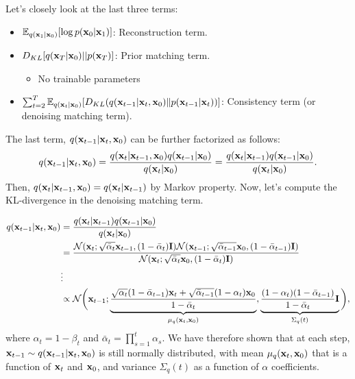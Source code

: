 Let's closely look at the last three terms:
\begin{itemize}
	\item $\mathbb{E}_{q({\mathbf{x}}_{1}|{\mathbf{x}}_0)}[\log p({\mathbf{x}}_0|{\mathbf{x}}_{1})]$: Reconstruction term. 
	\item $D_{KL} [ q({\mathbf{x}}_{T}|{\mathbf{x}}_0)||p({\mathbf{x}}_T) ]$: Prior matching term.
		\begin{itemize}
			\item No trainable parameters 
		\end{itemize}
	\item $\sum_{t=2}^{T}\mathbb{E}_{q({\mathbf{x}}_{t}|{\mathbf{x}}_0)}[D_{KL}(q({\mathbf{x}}_{t-1}|{\mathbf{x}}_t, {\mathbf{x}}_0)\|p({\mathbf{x}}_{t-1}|{\mathbf{x}}_{t}))]$: Consistency term (or denoising matching term).
\end{itemize}
The last term, $q({\mathbf{x}}_{t-1}|{\mathbf{x}}_t, {\mathbf{x}}_0)$ can be further factorized as follows:
\begin{align*}
	q({\mathbf{x}}_{t-1}|{\mathbf{x}}_t, {\mathbf{x}}_0) = \frac{q({\mathbf{x}}_{t}|{\mathbf{x}}_{t-1}, {\mathbf{x}}_0)q({\mathbf{x}}_{t-1}|{\mathbf{x}}_0)}{q({\mathbf{x}}_{t}|{\mathbf{x}}_0)}=\frac{q({\mathbf{x}}_{t}|{\mathbf{x}}_{t-1})q({\mathbf{x}}_{t-1}|{\mathbf{x}}_0)}{q({\mathbf{x}}_{t}|{\mathbf{x}}_0)}.
\end{align*}
Then, $q({\mathbf{x}}_{t}|{\mathbf{x}}_{t-1}, {\mathbf{x}}_0) = q({\mathbf{x}}_{t}|{\mathbf{x}}_{t-1})$ by Markov property. Now, let's compute the KL-divergence in the denoising matching term. 

\begin{align}
	q({\mathbf{x}}_{t-1}|{\mathbf{x}}_t, {\mathbf{x}}_0) &=\frac{q({\mathbf{x}}_{t}|{\mathbf{x}}_{t-1})q({\mathbf{x}}_{t-1}|{\mathbf{x}}_0)}{q({\mathbf{x}}_{t}|{\mathbf{x}}_0)}\\
								 &= \frac{\mathcal{N}(\mathbf{x}_t; \sqrt{\bar{\alpha}_t} {\mathbf{x}}_{t-1}, (1-\bar{\alpha}_t)\mathbf{I})\mathcal{N}(\mathbf{x}_{t-1}; \sqrt{\bar{\alpha}_{t-1}} {\mathbf{x}}_{0}, (1-\bar{\alpha}_{t-1})\mathbf{I})}{\mathcal{N}(\mathbf{x}_t; \sqrt{\bar{\alpha}_t} {\mathbf{x}}_{0}, (1-\bar{\alpha}_t)\mathbf{I})}\\
								 & \vdots\\
								 &\propto \mathcal{N}\bigg({\mathbf{x}}_{t-1};\underbrace{\frac{\sqrt{{\alpha}_{t}}(1-\bar{\alpha}_{t-1}){\mathbf{x}}_t+\sqrt{\bar{\alpha}_{t-1}}(1-{\alpha}_{t}){\mathbf{x}}_0}{1-\bar{\alpha}_{t}}}_{\mu_q({\mathbf{x}}_t,{\mathbf{x}}_0)}, \underbrace{\frac{(1-{\alpha}_{t})(1-\bar{\alpha}_{t-1})}{1-\bar{\alpha}_{t}}\mathbf{I}}_{\Sigma_{q}(t)}\bigg),
	\label{eq:diffusion_kl_true_denoising}
\end{align}
where $\alpha_t = 1-\beta_t$ and $\bar{\alpha}_t = \prod_{s=1}^t \alpha_s$. We have therefore shown that at each step, ${\mathbf{x}}_{t-1} \sim q({\mathbf{x}}_{t-1}|{\mathbf{x}}_t, {\mathbf{x}}_0)$ is still normally distributed, with mean $\mu_q({\mathbf{x}}_t,{\mathbf{x}}_0)$ that is a function of ${\mathbf{x}}_t$ and ${\mathbf{x}}_0$, and variance $\Sigma_q(t)$ as a function of $\alpha$ coefficients. 

